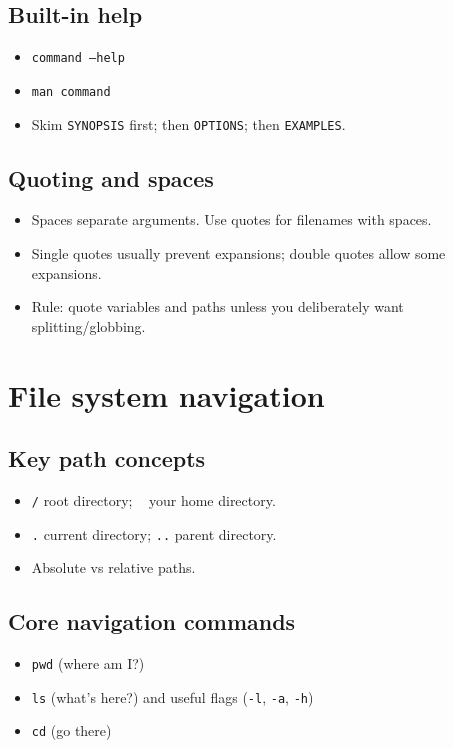 \subsection{Built-in help}
\begin{itemize}
\item \texttt{command --help}
\item \texttt{man command}
\item Skim \texttt{SYNOPSIS} first; then \texttt{OPTIONS}; then \texttt{EXAMPLES}.
\end{itemize}

\subsection{Quoting and spaces}
\begin{itemize}
\item Spaces separate arguments. Use quotes for filenames with spaces.
\item Single quotes usually prevent expansions; double quotes allow some expansions.
\item Rule: quote variables and paths unless you deliberately want splitting/globbing.
\end{itemize}

\section{File system navigation}
\subsection{Key path concepts}
\begin{itemize}
\item \texttt{/} root directory; \texttt{~} your home directory.
\item \texttt{.} current directory; \texttt{..} parent directory.
\item Absolute vs relative paths.
\end{itemize}

\subsection{Core navigation commands}
\begin{itemize}
\item \texttt{pwd} (where am I?)
\item \texttt{ls} (what's here?) and useful flags (\texttt{-l}, \texttt{-a}, \texttt{-h})
\item \texttt{cd} (go there)
\end{itemize}

